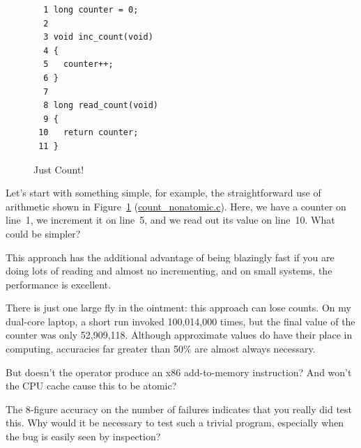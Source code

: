 \begin{figure}[bp]
{ \scriptsize
\begin{verbatim}
  1 long counter = 0;
  2 
  3 void inc_count(void)
  4 {
  5   counter++;
  6 }
  7 
  8 long read_count(void)
  9 {
 10   return counter;
 11 }
\end{verbatim}
}
\caption{Just Count!}
\label{fig:count:Just Count!}
\end{figure}

Let's start with something simple, for example, the straightforward
use of arithmetic shown in
Figure~\ref{fig:count:Just Count!} (\url{count_nonatomic.c}).
Here, we have a counter on line~1, we increment it on line~5, and we
read out its value on line~10.
What could be simpler?

This approach has the additional advantage of being blazingly fast if
you are doing lots of reading and almost no incrementing, and on small
systems, the performance is excellent.

There is just one large fly in the ointment: this approach can lose
counts.
On my dual-core laptop, a short run invoked 
100,014,000 times, but the final value of the counter was only
52,909,118.
Although approximate values do have their place in computing,
accuracies far greater than 50\% are almost always necessary.

\QuickQuiz{}
	But doesn't the \co{++} operator produce an x86 add-to-memory
	instruction?
	And won't the CPU cache cause this to be atomic?
 \QuickQuizEnd

\QuickQuiz{}
	The 8-figure accuracy on the number of failures indicates
	that you really did test this.
	Why would it be necessary to test such a trivial program,
	especially when the bug is easily seen by inspection?
 \QuickQuizEnd

